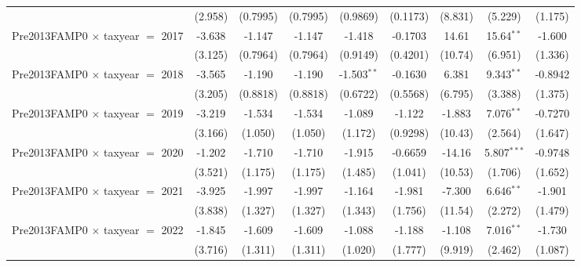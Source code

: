 \begin{tabular}{lcccccccc}
                                           & (2.958)       & (0.7995)      & (0.7995)      & (0.9869)      & (0.1173)       & (8.831)       & (5.229)       & (1.175)\\   
   Pre2013FAMP0 $\times$ taxyear $=$ 2017  & -3.638        & -1.147        & -1.147        & -1.418        & -0.1703        & 14.61         & 15.64$^{**}$  & -1.600\\   
                                           & (3.125)       & (0.7964)      & (0.7964)      & (0.9149)      & (0.4201)       & (10.74)       & (6.951)       & (1.336)\\   
   Pre2013FAMP0 $\times$ taxyear $=$ 2018  & -3.565        & -1.190        & -1.190        & -1.503$^{**}$ & -0.1630        & 6.381         & 9.343$^{**}$  & -0.8942\\   
                                           & (3.205)       & (0.8818)      & (0.8818)      & (0.6722)      & (0.5568)       & (6.795)       & (3.388)       & (1.375)\\   
   Pre2013FAMP0 $\times$ taxyear $=$ 2019  & -3.219        & -1.534        & -1.534        & -1.089        & -1.122         & -1.883        & 7.076$^{**}$  & -0.7270\\   
                                           & (3.166)       & (1.050)       & (1.050)       & (1.172)       & (0.9298)       & (10.43)       & (2.564)       & (1.647)\\   
   Pre2013FAMP0 $\times$ taxyear $=$ 2020  & -1.202        & -1.710        & -1.710        & -1.915        & -0.6659        & -14.16        & 5.807$^{***}$ & -0.9748\\   
                                           & (3.521)       & (1.175)       & (1.175)       & (1.485)       & (1.041)        & (10.53)       & (1.706)       & (1.652)\\   
   Pre2013FAMP0 $\times$ taxyear $=$ 2021  & -3.925        & -1.997        & -1.997        & -1.164        & -1.981         & -7.300        & 6.646$^{**}$  & -1.901\\   
                                           & (3.838)       & (1.327)       & (1.327)       & (1.343)       & (1.756)        & (11.54)       & (2.272)       & (1.479)\\   
   Pre2013FAMP0 $\times$ taxyear $=$ 2022  & -1.845        & -1.609        & -1.609        & -1.088        & -1.188         & -1.108        & 7.016$^{**}$  & -1.730\\   
                                           & (3.716)       & (1.311)       & (1.311)       & (1.020)       & (1.777)        & (9.919)       & (2.462)       & (1.087)\\   

\end{tabular}
